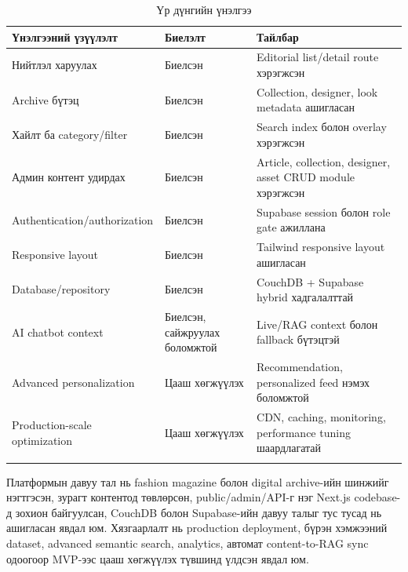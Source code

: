 \begin{longtable}{|L{0.30\textwidth}|L{0.24\textwidth}|L{0.32\textwidth}|}
  \hline
  \textbf{Үнэлгээний үзүүлэлт} & \textbf{Биелэлт} & \textbf{Тайлбар} \\ \hline
  Нийтлэл харуулах & Биелсэн & Editorial list/detail route хэрэгжсэн \\ \hline
  Archive бүтэц & Биелсэн & Collection, designer, look metadata ашигласан \\ \hline
  Хайлт ба category/filter & Биелсэн & Search index болон overlay хэрэгжсэн \\ \hline
  Админ контент удирдах & Биелсэн & Article, collection, designer, asset CRUD module хэрэгжсэн \\ \hline
  Authentication/authorization & Биелсэн & Supabase session болон role gate ажиллана \\ \hline
  Responsive layout & Биелсэн & Tailwind responsive layout ашигласан \\ \hline
  Database/repository & Биелсэн & CouchDB + Supabase hybrid хадгалалттай \\ \hline
  AI chatbot context & Биелсэн, сайжруулах боломжтой & Live/RAG context болон fallback бүтэцтэй \\ \hline
  Advanced personalization & Цааш хөгжүүлэх & Recommendation, personalized feed нэмэх боломжтой \\ \hline
  Production-scale optimization & Цааш хөгжүүлэх & CDN, caching, monitoring, performance tuning шаардлагатай \\ \hline
  \caption{Үр дүнгийн үнэлгээ}
  \label{tab:ch4-result-evaluation}\\
\end{longtable}

Платформын давуу тал нь fashion magazine болон digital archive-ийн шинжийг нэгтгэсэн, зурагт контентод төвлөрсөн, public/admin/API-г нэг Next.js codebase-д зохион байгуулсан, CouchDB болон Supabase-ийн давуу талыг тус тусад нь ашигласан явдал юм. Хязгаарлалт нь production deployment, бүрэн хэмжээний dataset, advanced semantic search, analytics, автомат content-to-RAG sync одоогоор MVP-ээс цааш хөгжүүлэх түвшинд үлдсэн явдал юм.

